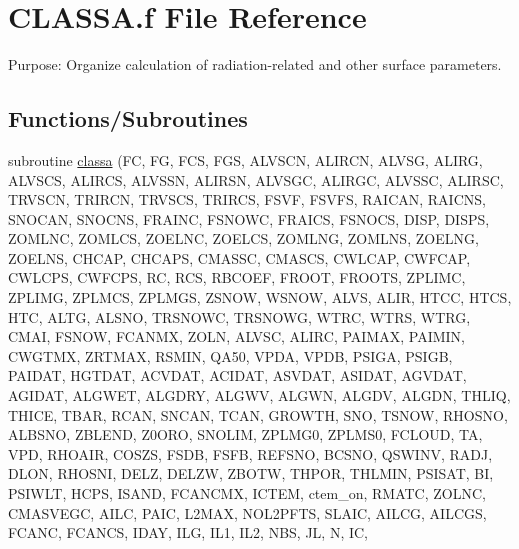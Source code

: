 \hypertarget{CLASSA_8f}{}\section{C\+L\+A\+S\+S\+A.\+f File Reference}
\label{CLASSA_8f}


Purpose\+: Organize calculation of radiation-\/related and other surface parameters.  


\subsection*{Functions/\+Subroutines}
\begin{DoxyCompactItemize}
\item 
subroutine \hyperlink{CLASSA_8f_ad4c630143a7ebd581213e2acfaf3643e}{classa} (F\+C, F\+G, F\+C\+S, F\+G\+S, A\+L\+V\+S\+C\+N, A\+L\+I\+R\+C\+N, A\+L\+V\+S\+G, A\+L\+I\+R\+G, A\+L\+V\+S\+C\+S, A\+L\+I\+R\+C\+S, A\+L\+V\+S\+S\+N, A\+L\+I\+R\+S\+N, A\+L\+V\+S\+G\+C, A\+L\+I\+R\+G\+C, A\+L\+V\+S\+S\+C, A\+L\+I\+R\+S\+C, T\+R\+V\+S\+C\+N, T\+R\+I\+R\+C\+N, T\+R\+V\+S\+C\+S, T\+R\+I\+R\+C\+S, F\+S\+V\+F, F\+S\+V\+F\+S, R\+A\+I\+C\+A\+N, R\+A\+I\+C\+N\+S, S\+N\+O\+C\+A\+N, S\+N\+O\+C\+N\+S, F\+R\+A\+I\+N\+C, F\+S\+N\+O\+W\+C, F\+R\+A\+I\+C\+S, F\+S\+N\+O\+C\+S, D\+I\+S\+P, D\+I\+S\+P\+S, Z\+O\+M\+L\+N\+C, Z\+O\+M\+L\+C\+S, Z\+O\+E\+L\+N\+C, Z\+O\+E\+L\+C\+S, Z\+O\+M\+L\+N\+G, Z\+O\+M\+L\+N\+S, Z\+O\+E\+L\+N\+G, Z\+O\+E\+L\+N\+S, C\+H\+C\+A\+P, C\+H\+C\+A\+P\+S, C\+M\+A\+S\+S\+C, C\+M\+A\+S\+C\+S, C\+W\+L\+C\+A\+P, C\+W\+F\+C\+A\+P, C\+W\+L\+C\+P\+S, C\+W\+F\+C\+P\+S, R\+C, R\+C\+S, R\+B\+C\+O\+E\+F, F\+R\+O\+O\+T, F\+R\+O\+O\+T\+S, Z\+P\+L\+I\+M\+C, Z\+P\+L\+I\+M\+G, Z\+P\+L\+M\+C\+S, Z\+P\+L\+M\+G\+S, Z\+S\+N\+O\+W, W\+S\+N\+O\+W, A\+L\+V\+S, A\+L\+I\+R, H\+T\+C\+C, H\+T\+C\+S, H\+T\+C, A\+L\+T\+G, A\+L\+S\+N\+O, T\+R\+S\+N\+O\+W\+C, T\+R\+S\+N\+O\+W\+G, W\+T\+R\+C, W\+T\+R\+S, W\+T\+R\+G, C\+M\+A\+I, F\+S\+N\+O\+W, F\+C\+A\+N\+M\+X, Z\+O\+L\+N, A\+L\+V\+S\+C, A\+L\+I\+R\+C, P\+A\+I\+M\+A\+X, P\+A\+I\+M\+I\+N, C\+W\+G\+T\+M\+X, Z\+R\+T\+M\+A\+X, R\+S\+M\+I\+N, Q\+A50, V\+P\+D\+A, V\+P\+D\+B, P\+S\+I\+G\+A, P\+S\+I\+G\+B, P\+A\+I\+D\+A\+T, H\+G\+T\+D\+A\+T, A\+C\+V\+D\+A\+T, A\+C\+I\+D\+A\+T, A\+S\+V\+D\+A\+T, A\+S\+I\+D\+A\+T, A\+G\+V\+D\+A\+T, A\+G\+I\+D\+A\+T, A\+L\+G\+W\+E\+T, A\+L\+G\+D\+R\+Y, A\+L\+G\+W\+V, A\+L\+G\+W\+N, A\+L\+G\+D\+V, A\+L\+G\+D\+N, T\+H\+L\+I\+Q, T\+H\+I\+C\+E, T\+B\+A\+R, R\+C\+A\+N, S\+N\+C\+A\+N, T\+C\+A\+N, G\+R\+O\+W\+T\+H, S\+N\+O, T\+S\+N\+O\+W, R\+H\+O\+S\+N\+O, A\+L\+B\+S\+N\+O, Z\+B\+L\+E\+N\+D, Z0\+O\+R\+O, S\+N\+O\+L\+I\+M, Z\+P\+L\+M\+G0, Z\+P\+L\+M\+S0, F\+C\+L\+O\+U\+D, T\+A, V\+P\+D, R\+H\+O\+A\+I\+R, C\+O\+S\+Z\+S, F\+S\+D\+B, F\+S\+F\+B, R\+E\+F\+S\+N\+O, B\+C\+S\+N\+O, Q\+S\+W\+I\+N\+V, R\+A\+D\+J, D\+L\+O\+N, R\+H\+O\+S\+N\+I, D\+E\+L\+Z, D\+E\+L\+Z\+W, Z\+B\+O\+T\+W, T\+H\+P\+O\+R, T\+H\+L\+M\+I\+N, P\+S\+I\+S\+A\+T, B\+I, P\+S\+I\+W\+L\+T, H\+C\+P\+S, I\+S\+A\+N\+D, F\+C\+A\+N\+C\+M\+X, I\+C\+T\+E\+M, ctem\+\_\+on, R\+M\+A\+T\+C, Z\+O\+L\+N\+C, C\+M\+A\+S\+V\+E\+G\+C, A\+I\+L\+C, P\+A\+I\+C, L2\+M\+A\+X, N\+O\+L2\+P\+F\+T\+S, S\+L\+A\+I\+C, A\+I\+L\+C\+G, A\+I\+L\+C\+G\+S, F\+C\+A\+N\+C, F\+C\+A\+N\+C\+S, I\+D\+A\+Y, I\+L\+G, I\+L1, I\+L2, N\+B\+S, J\+L, N, I\+C, 
\end{DoxyCompactItemize}
